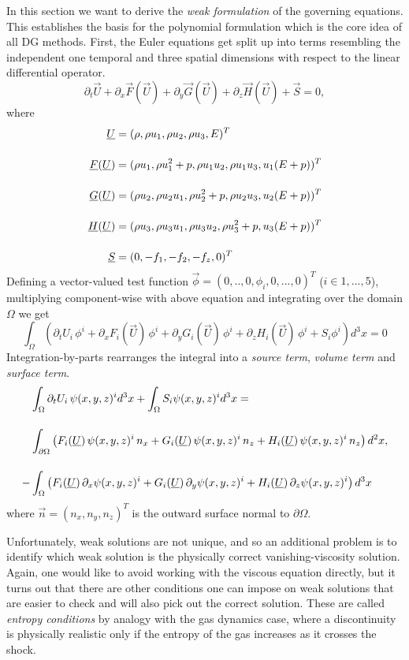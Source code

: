 In this section we want to derive the \emph{weak formulation} of the governing
equations. This establishes the basis for the polynomial formulation which is
the core idea of all DG methods.  First, the Euler equations get split up into
terms resembling the independent one temporal and three spatial
dimensions with respect to the linear differential operator.
\begin{equation}
\partial_t \vec{U} + \partial_x\vec{F}(\vec{U})+ \partial_y\vec{G}(\vec{U}) + \partial_z\vec{H}(\vec{U}) + \vec{S} = 0,
\end{equation}
where
\begin{align}
    \vec{U} &= (\dens, \dens\vels_1, \dens\vels_2, \dens\vels_3, \Ener)^T\br
    \vec{F}(\vec{U}) &= (\dens\vels_1, \dens\vels_1^2 + \pres, \dens\vels_1\vels_2, \dens\vels_1\vels_3, \vels_1(\Ener + \pres))^T\br
    \vec{G}(\vec{U}) &= (\dens\vels_2, \dens\vels_2\vels_1, \dens\vels_2^2 + \pres, \dens\vels_2\vels_3, \vels_2(\Ener + \pres))^T\br
    \vec{H}(\vec{U}) &= (\dens\vels_3, \dens\vels_3\vels_1, \dens\vels_3\vels_2, \dens\vels_3^2 + \pres, \vels_3(\Ener + \pres))^T\br
    \vec{S} &= (0,-f_1,-f_2,-f_z,0)^T
\end{align}
Defining a vector-valued test function $\vec{\phi} = (0,..,0,\phi_i,0,...,0)^T$ ($i\in{1,...,5}$), multiplying component-wise
with above equation and integrating over the domain $\Omega$ we get
\begin{equation}
    \int_\Omega \left( \partial_tU_i\,\phi^i 
        + \partial_x F_i(\vec{U})\,\phi^i 
        + \partial_y G_i(\vec{U})\,\phi^i 
        + \partial_z H_i(\vec{U})\,\phi^i + S_i \phi^i \right) d^3x = 0
\end{equation}
Integration-by-parts rearranges the integral into a \emph{source term}, \emph{volume term} and \emph{surface term}.
\begin{align}
\label{eqn:weak-formulation}
    &\int_\Omega \partial_t U_i\,\psi(x,y,z)^i d^3x + \int_\Omega S_i \psi(x,y,z)^i d^3x = \br
        & \int_{\partial\Omega} \left(F_i(\vec{U})\,\psi(x,y,z)^i\,n_x + G_i(\vec{U})\,\psi(x,y,z)^i\,n_z + H_i(\vec{U})\,\psi(x,y,z)^i\,n_z \right) d^2x,\nonumber \br
        -&\int_\Omega \left(F_i(\vec{U})\,\partial_x \psi(x,y,z)^i + G_i(\vec{U})\,\partial_y \psi(x,y,z)^i + H_i(\vec{U})\,\partial_z \psi(x,y,z)^i \right) d^3x
\end{align}
where $\vec{n} = (n_x,n_y,n_z)^T$ is the outward surface normal to $\partial\Omega$.

Unfortunately, weak solutions are not unique, and so an additional problem is
to identify which weak solution is the physically correct vanishing-viscosity
solution. Again, one would like to avoid working with the viscous equation
directly, but it turns out that there are other conditions one can impose on
weak solutions that are easier to check and will also pick out the correct
solution. These are called \emph{entropy conditions} by analogy with the gas
dynamics case, where a discontinuity is physically realistic only if the
entropy of the gas increases as it crosses the shock.
